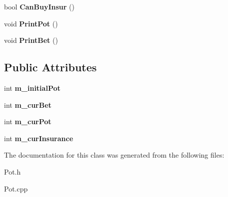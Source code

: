 \begin{DoxyCompactItemize}
\item 
bool {\bfseries Can\+Buy\+Insur} ()\hypertarget{class_pot_a7e13e6cdb743259fdb3784ec1272ab98}{}\label{class_pot_a7e13e6cdb743259fdb3784ec1272ab98}

\item 
void {\bfseries Print\+Pot} ()\hypertarget{class_pot_a1c3fde3bd8e004664efb06846ead92fc}{}\label{class_pot_a1c3fde3bd8e004664efb06846ead92fc}

\item 
void {\bfseries Print\+Bet} ()\hypertarget{class_pot_a770efd0511771dea454510cb89be354b}{}\label{class_pot_a770efd0511771dea454510cb89be354b}

\end{DoxyCompactItemize}
\subsection*{Public Attributes}
\begin{DoxyCompactItemize}
\item 
int {\bfseries m\+\_\+initial\+Pot}\hypertarget{class_pot_ac83f0f8076ae4581017b04acedb15162}{}\label{class_pot_ac83f0f8076ae4581017b04acedb15162}

\item 
int {\bfseries m\+\_\+cur\+Bet}\hypertarget{class_pot_a9387b52aafa588830e58056efb1df365}{}\label{class_pot_a9387b52aafa588830e58056efb1df365}

\item 
int {\bfseries m\+\_\+cur\+Pot}\hypertarget{class_pot_a3c53359bce49d08ad42378a40223ec76}{}\label{class_pot_a3c53359bce49d08ad42378a40223ec76}

\item 
int {\bfseries m\+\_\+cur\+Insurance}\hypertarget{class_pot_adc1c1fcd3be66dadeab0633fdbde460c}{}\label{class_pot_adc1c1fcd3be66dadeab0633fdbde460c}

\end{DoxyCompactItemize}


The documentation for this class was generated from the following files\+:\begin{DoxyCompactItemize}
\item 
Pot.\+h\item 
Pot.\+cpp\end{DoxyCompactItemize}
